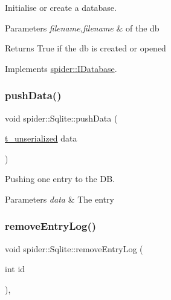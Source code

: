 Initialise or create a database. 


\begin{DoxyParams}{Parameters}
{\em filename,filename} & of the db \\
\hline
\end{DoxyParams}
\begin{DoxyReturn}{Returns}
True if the db is created or opened 
\end{DoxyReturn}


Implements \hyperlink{classspider_1_1_i_database_a307a753933fa76e57a96dfbb65489cc7}{spider\+::\+I\+Database}.

\mbox{\label{classspider_1_1_sqlite_ac46531bba41f8e59c873f179cf10c9a0}} 
\subsubsection{\texorpdfstring{push\+Data()}{pushData()}}
{\footnotesize\ttfamily void spider\+::\+Sqlite\+::push\+Data (\begin{DoxyParamCaption}\item[{\hyperlink{structt__unserialized}{t\+\_\+unserialized}}]{data }\end{DoxyParamCaption})}



Pushing one entry to the DB. 


\begin{DoxyParams}{Parameters}
{\em data} & The entry \\
\hline
\end{DoxyParams}
\mbox{\label{classspider_1_1_sqlite_a62ae99de93b05a3c3282ac42fbc13468}} 
\subsubsection{\texorpdfstring{remove\+Entry\+Log()}{removeEntryLog()}}
{\footnotesize\ttfamily void spider\+::\+Sqlite\+::remove\+Entry\+Log (\begin{DoxyParamCaption}\item[{int}]{id }\end{DoxyParamCaption})\hspace{0.3cm}{\ttfamily [override]}, {\ttfamily [virtual]}}



